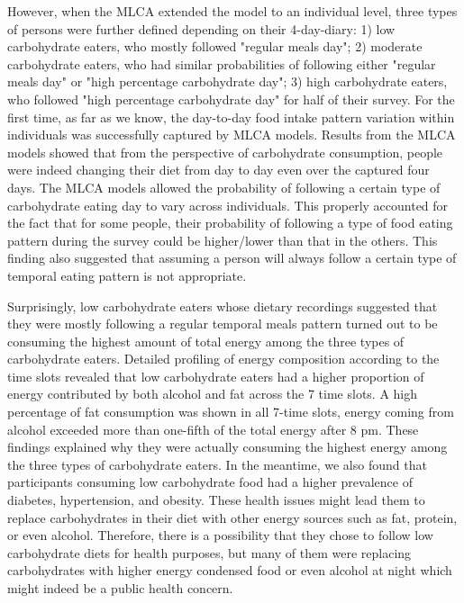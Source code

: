 However, when the MLCA extended the model to an individual level, three types of persons were further defined depending on their 4-day-diary: 1) low carbohydrate eaters, who mostly followed "regular meals day"; 2) moderate carbohydrate eaters, who had similar probabilities of following either "regular meals day" or "high percentage carbohydrate day"; 3) high carbohydrate eaters, who followed "high percentage carbohydrate day" for half of their survey. For the first time, as far as we know, the day-to-day food intake pattern variation within individuals was successfully captured by MLCA models. Results from the MLCA models showed that from the perspective of carbohydrate consumption, people were indeed changing their diet from day to day even over the captured four days. The MLCA models allowed the probability of following a certain type of carbohydrate eating day to vary across individuals. This properly accounted for the fact that for some people, their probability of following a type of food eating pattern during the survey could be higher/lower than that in the others. This finding also suggested that assuming a person will always follow a certain type of temporal eating pattern is not appropriate.

Surprisingly, low carbohydrate eaters whose dietary recordings suggested that they were mostly following a regular temporal meals pattern turned out to be consuming the highest amount of total energy among the three types of carbohydrate eaters. Detailed profiling of energy composition according to the time slots revealed that low carbohydrate eaters had a higher proportion of energy contributed by both alcohol and fat across the 7 time slots. A high percentage of fat consumption was shown in all 7-time slots, energy coming from alcohol exceeded more than one-fifth of the total energy after 8 pm. These findings explained why they were actually consuming the highest energy among the three types of carbohydrate eaters. In the meantime, we also found that participants consuming low carbohydrate food had a higher prevalence of diabetes, hypertension, and obesity. These health issues might lead them to replace carbohydrates in their diet with other energy sources such as fat, protein, or even alcohol. Therefore, there is a possibility that they chose to follow low carbohydrate diets for health purposes, but many of them were replacing carbohydrates with higher energy condensed food or even alcohol at night which might indeed be a public health concern. 

